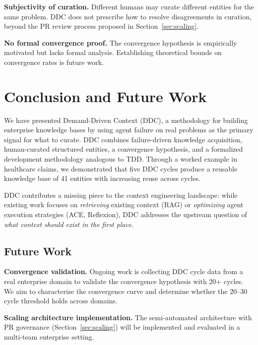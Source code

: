 \documentclass[11pt,a4paper]{article}
\begin{document}
\textbf{Subjectivity of curation.} Different humans may curate different entities for the same problem. DDC does not prescribe how to resolve disagreements in curation, beyond the PR review process proposed in Section~\ref{sec:scaling}.

\textbf{No formal convergence proof.} The convergence hypothesis is empirically motivated but lacks formal analysis. Establishing theoretical bounds on convergence rates is future work.

\section{Conclusion and Future Work}
\label{sec:conclusion}

We have presented Demand-Driven Context (DDC), a methodology for building enterprise knowledge bases by using agent failure on real problems as the primary signal for what to curate. DDC combines failure-driven knowledge acquisition, human-curated structured entities, a convergence hypothesis, and a formalized development methodology analogous to TDD. Through a worked example in healthcare claims, we demonstrated that five DDC cycles produce a reusable knowledge base of 41 entities with increasing reuse across cycles.

DDC contributes a missing piece to the context engineering landscape: while existing work focuses on \emph{retrieving} existing context (RAG) or \emph{optimizing} agent execution strategies (ACE, Reflexion), DDC addresses the upstream question of \emph{what context should exist in the first place}.

\subsection*{Future Work}

\textbf{Convergence validation.} Ongoing work is collecting DDC cycle data from a real enterprise domain to validate the convergence hypothesis with 20+ cycles. We aim to characterize the convergence curve and determine whether the 20--30 cycle threshold holds across domains.

\textbf{Scaling architecture implementation.} The semi-automated architecture with PR governance (Section~\ref{sec:scaling}) will be implemented and evaluated in a multi-team enterprise setting.
\end{document}
